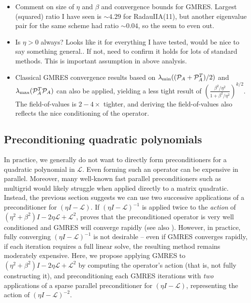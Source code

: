\documentclass[review]{siamart}
\begin{document}
{\color{blue}
\begin{itemize}
	\item Comment on size of $\eta$ and $\beta$ and convergence bounds for GMRES. Largest (squared)
	ratio I have seen is $\sim 4.29$ for RadauIIA(11), but another eigenvalue pair for the same
	scheme had ratio $\sim 0.04$, so the seem to even out.

	\item Is $\eta > 0$ always? Looks like it for everything I have tested, would be nice to
	say something general.. If not, need to confirm it holds for lots of standard methods.
	This is important assumption in above analysis.

	\item Classical GMRES convergence results based on $\lambda_{\textnormal{min}}((\mathcal{P}_A+
	\mathcal{P}_A^T)/2)$ and $\lambda_{\textnormal{max}}(\mathcal{P}_A^T\mathcal{P}_A)$ can also
	be applied, yielding a less tight result of $\left(\frac{\beta^2/\eta^2}{1 + \beta^2/\eta^2}\right)^{k/2}$.
	The field-of-values is $2-4\times$ tighter, and deriving the field-of-values also reflects the
	nice conditioning of the operator. 

\end{itemize}
}

\subsection{Preconditioning quadratic polynomials}

In practice, we generally do not want to directly form preconditioners for a quadratic
polynomial in $\mathcal{L}$. Even forming such an operator can be expensive in parallel.
Moreover, many well-known fast parallel preconditioners such as multigrid would likely
struggle when applied directly to a matrix quadratic. Instead, the previous section
suggests we can use two successive applications of a preconditioner for
$(\eta I - \mathcal{L})$. If $(\eta I - \mathcal{L})^{-1}$
is applied twice to the \textit{action} of $(\eta^2+\beta^2)I - 2\eta\mathcal{L} + \mathcal{L}^2$,
 proves that the preconditioned operator is very well conditioned and GMRES
will converge rapidly (see also ). However, in practice, fully converging
$(\eta I - \mathcal{L})^{-1}$ is not desirable --  even if GMRES converges rapidly,
if each iteration requires a full linear solve, the resulting method remains moderately
expensive. 
Here, we propose applying GMRES to $(\eta^2+\beta^2)I - 2\eta\mathcal{L} + \mathcal{L}^2$
by computing the operator's action (that is, not fully constructing it), and preconditioning
each GMRES iterations with \textit{two} applications of a sparse parallel preconditioner for
$(\eta I - \mathcal{L})$, representing the action of $(\eta I - \mathcal{L})^{-2}$. 
\end{document}
